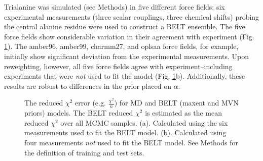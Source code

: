 \documentclass[journal=jacsat,manuscript=article]{achemso}
\begin{document}
Trialanine was simulated (see Methods) in five different force fields; six experimental measurements (three scalar couplings, three chemical shifts) probing the central alanine residue were used to construct a BELT ensemble.  The five force fields show considerable variation in their agreement with experiment (Fig. \ref{figure:ChiSquared}).  The amber96, amber99, charmm27, and oplsaa force fields, for example, initially show significant deviation from the experimental measurements.  Upon reweighting, however, all five force fields agree with experiment--including experiments that were \emph{not} used to fit the model (Fig. \ref{figure:ChiSquared}b).  Additionally, these results are robust to differences in the prior placed on $\alpha$.

\begin{figure}
\caption{
The reduced $\chi^2$ error (e.g. $\frac{\chi^2}{n}$) for MD and BELT (maxent and MVN priors) models.  The BELT reduced $\chi^2$ is estimated as the mean reduced $\chi^2$ over all MCMC samples.  (a).  Calculated using the six measurements used to fit the BELT model.  (b).  Calculated using four measurements \emph{not} used to fit the BELT model.  See Methods for the definition of training and test sets.
}
\label{figure:ChiSquared}
\end{figure}
\end{document}
